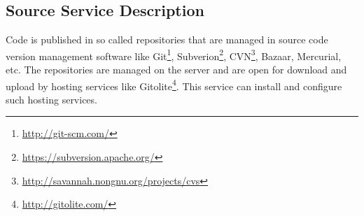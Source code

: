 \subsection{Source Service Description}

Code is published in so called repositories
that are managed in source code version management software like 
Git\footnote{\url{http://git-scm.com/}}, 
Subverion\footnote{\url{https://subversion.apache.org/}},
CVN\footnote{\url{http://savannah.nongnu.org/projects/cvs}}, 
Bazaar, Mercurial, etc. The repositories are managed on the server
and are open for download and upload by hosting services like 
Gitolite\footnote{\url{http://gitolite.com/}}. This service can
install and configure such hosting services. 

